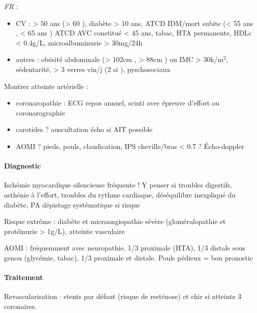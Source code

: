 \documentclass[11pt]{article}
\begin{document}
\emph{FR} :
\begin{itemize}
\item CV : > 50 ans \male (> 60 \female), diabète > 10 ans, ATCD IDM/mort subite (< 55
ans \male, < 65 ans \female) ATCD AVC constitué < 45 ans, tabac, HTA
permanente, HDLc < 0.4g/L, microalbuminurie > 30mg/24h
\item autres : obésité abdominale (> 102cm \male, > 88cm \female) ou IMC >
30k/m\(^{\text{2}}\), sédentarité, > 3 verres vin/j (2 si \female), pyschosociaux
\end{itemize}

Montrer atteinte artérielle : 
\begin{itemize}
\item coronaropathie : ECG repos annuel, scinti avec épreuve d'effort ou coronarographie
\item carotides ? auscultation \thus écho si AIT possible
\item AOMI ? pieds, pouls, claudication, IPS cheville/bras < 0.7 ? Écho-doppler
\end{itemize}

\paragraph{Diagnostic}
\label{sec:org23d7d8a}
Ischémie myocardique silencieuse fréquente ! Y penser si troubles digestifs,
asthénie à l'effort, troubles du rythme cardiaque, déséquilibre inexpliqué du
diabète, \dec PA \thus dépistage systématique si risque

Risque extrême : diabète et microangiopathie sévère (glomérulopathie et
protéinurie > 1g/L), atteinte vasculaire

AOMI : fréquemment avec neuropathie. 1/3 proximale (HTA), 1/3 distale sous
genou (glycémie, tabac), 1/3 proximale et distale. Pouls pédieux = bon pronostic

\paragraph{Traitement}
\label{sec:orgce7ac7e}
Revascularisation : stents par défaut (risque de resténose) et chir si atteinte
3 coronaires.
\end{document}
